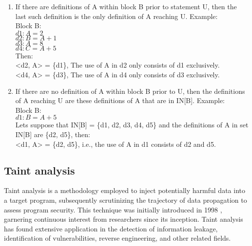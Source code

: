 \begin{enumerate}
\item If there are definitions of A within block B prior to statement U, then the last such definition is the only definition of A reaching U. Example:\\

Block B:\\
\(d1: A = 2\)\\ 
\(d2: B = A + 1\)\\
\(d3: A = 8\)\\
\(d4: C = A + 5\)\\

Then:\\ 
<d2, A> = \{d1\}, The use of A in d2 only consists of d1 exclusively.\\ 
<d4, A> = \{d3\}, The use of A in d4 only consists of d3 exclusively.

\item If there are no definition of A within block B prior to U, then the definitions of A reaching U are these definitions of A that are in IN[B]. Example:\\

Block B:\\
\(d1: B = A + 5\)\\ 

Lets suppose that IN[B] = \{d1, d2, d3, d4, d5\} and the definitions of A in set IN[B] are \{d2, d5\}, then:\\
<d1, A> = \{d2, d5\}, i.e., the use of A in d1 consists of d2 and d5.

\end{enumerate}



\subsection{Taint analysis} %
\label{sec: Taint_analysis}

Taint analysis is a methodology employed to inject potentially harmful data into a target program, subsequently scrutinizing the trajectory of data propagation to assess program security. This technique was initially introduced in 1998 \cite{Ren_2020}, garnering continuous interest from researchers since its inception. Taint analysis has found extensive application in the detection of information leakage, identification of vulnerabilities, reverse engineering, and other related fields.

